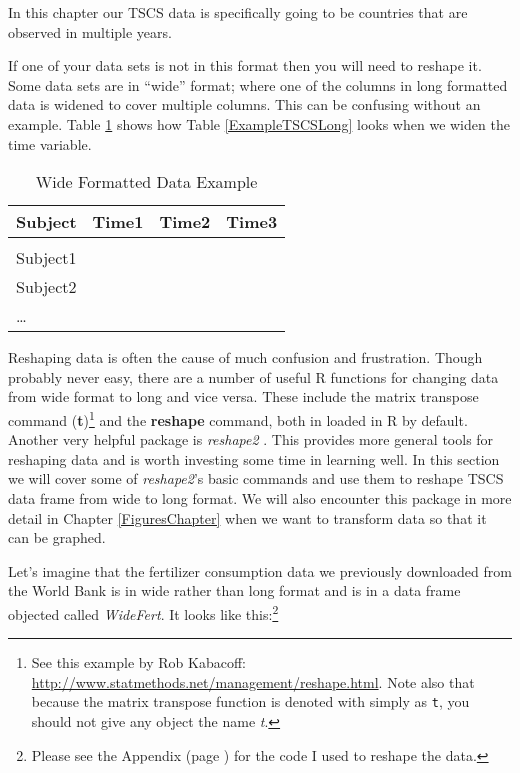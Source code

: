 \noindent In this chapter our TSCS data is specifically going to be countries that are observed in multiple years.

\noindent If one of your data sets is not in this format then you will need to reshape it. Some data sets are in ``wide'' format; where one of the columns in long formatted data is widened to cover multiple columns. This can be confusing without an example. Table \ref{ExampleWide} shows how Table \ref{ExampleTSCSLong} looks when we widen the time variable.

\begin{table}[h!]
    \caption{Wide Formatted Data Example}
    \label{ExampleWide}
    \begin{tabular}{l c c c}
        \\[0.15cm]
        \hline 
        Subject & Time1 & Time2 & Time3 \\
        \hline \\[0.1cm]
        Subject1 & & & \\[0.25cm]
        Subject2 & & & \\[0.25cm]
        \ldots & & & \\[0.25cm]
        \hline
    \end{tabular}
\end{table}

Reshaping data is often the cause of much confusion and frustration. Though probably never easy, there are a number of useful R functions for changing data from wide format to long and vice versa. These include the matrix transpose command (\textbf{t})\footnote{See this example by Rob Kabacoff: \url{http://www.statmethods.net/management/reshape.html}. Note also that because the matrix transpose function is denoted with simply as \texttt{t}, you should not give any object the name \emph{t}.} and the \textbf{reshape} command, both in loaded in R by default.  Another very helpful package is \emph{reshape2} \citep{R-reshape2}. This provides more general tools for reshaping data and is worth investing some time in learning well. In this section we will cover some of \emph{reshape2}'s basic commands and use them to reshape TSCS data frame from wide to long format. We will also encounter this package in more detail in Chapter \ref{FiguresChapter} when we want to transform data so that it can be graphed.

Let's imagine that the fertilizer consumption data we previously downloaded from the World Bank is in wide rather than long format and is in a data frame objected called \emph{WideFert}. It looks like this:\footnote{Please see the Appendix (page \pageref{WideAppendix}) for the code I used to reshape the data.}





